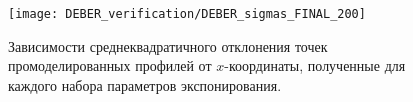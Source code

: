 \begin{figure}[t]
	\begin{center}
		\texttt{[image: DEBER\_verification/DEBER\_sigmas\_FINAL\_200]}
	\end{center}
	\vspace{-1em}
	\caption{Зависимости среднеквадратичного отклонения точек промоделированных профилей от $x$-координаты, полученные для каждого набора параметров экспонирования.}
	\label{fig:DEBER_sigmas}
	\vspace{1em}
\end{figure}
